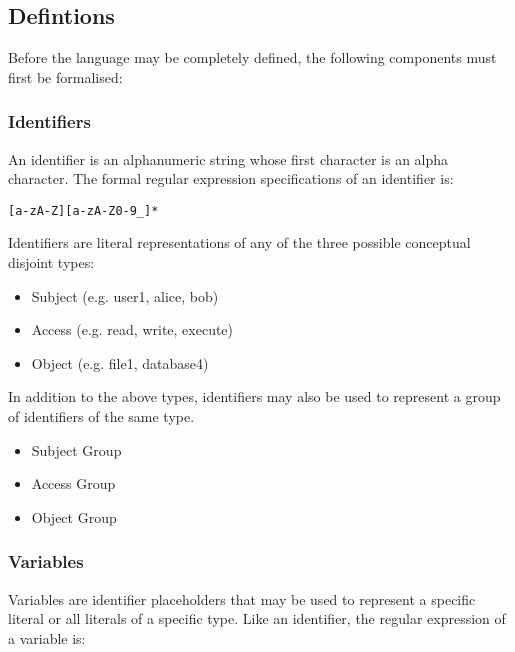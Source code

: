 \documentclass[a4paper]{article}
\begin{document}
    \subsection{Defintions}

      Before the language may be completely defined, the following components 
      must first be formalised:
 
      \subsubsection{Identifiers}

        An identifier is an alphanumeric string whose first character is an
        alpha character. The formal regular expression specifications of an
        identifier is:

\begin{verbatim}
[a-zA-Z][a-zA-Z0-9_]*
\end{verbatim}

        Identifiers are literal representations of any of the three possible
        conceptual disjoint types:

        \begin{itemize}
          \item Subject (e.g. user1, alice, bob)
          \item Access (e.g. read, write, execute)
          \item Object (e.g. file1, database4)
        \end{itemize}

        In addition to the above types, identifiers may also be used to
        represent a group of identifiers of the same type.

        \begin{itemize}
          \item Subject Group
          \item Access Group
          \item Object Group
        \end{itemize}

      \subsubsection{Variables}

        Variables are identifier placeholders that may be used to represent a
        specific literal or all literals of a specific type. Like an identifier,
        the regular expression of a variable is:
\end{document}
